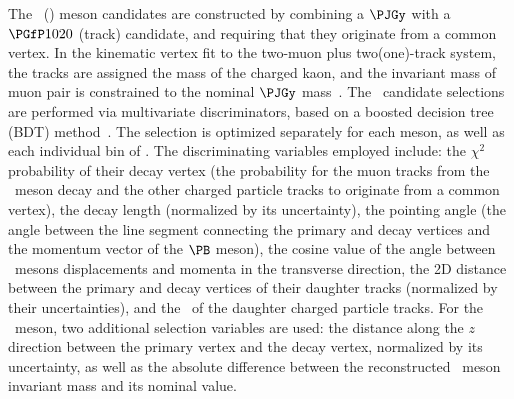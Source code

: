 The \PBzs\ (\PBp) meson candidates are constructed by combining a $\PJGy$ with a $\Pphi$ (track) candidate, and requiring that they originate from a common vertex. In the kinematic vertex fit to the two-muon plus two(one)-track system, the tracks are assigned the mass of the charged kaon, and the invariant mass of muon pair is constrained %
to the nominal $\PJGy$ mass~\cite{pdg2018}.
%
%
The \PB\ candidate selections are performed via multivariate discriminators, based on a boosted decision tree (BDT) method~\cite{Hocker:2007ht}. The selection is optimized separately for each meson, as well as each individual bin of \pt. 
%  
The discriminating variables employed include:
the $\chi^{2}$ probability of their decay vertex (the probability for the muon tracks from the \PJGy\ meson decay and the other charged particle tracks to originate from a common vertex), the decay length (normalized by its uncertainty), the pointing angle (the angle between the line segment connecting the primary and decay vertices and the momentum vector of the $\PB$ meson), the cosine value of the angle between \PB\ mesons displacements and momenta in the transverse direction, the 2D distance between the primary and decay vertices of their daughter tracks (normalized by their uncertainties), and the \pt\ of the daughter charged particle tracks. 
%
For the \PBzs\ meson, two additional selection variables are used: 
the distance along the $z$ direction between the primary vertex and the decay 
vertex, normalized by its uncertainty, as well as the absolute difference 
between the reconstructed  \Pphi\ meson invariant mass and its nominal value.


